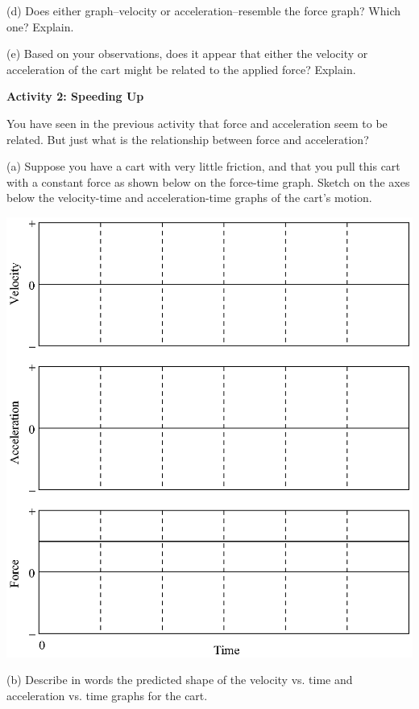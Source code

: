 (d) Does either graph--velocity or acceleration--resemble the force graph? Which
one? Explain.
\answerspace{20mm}

(e) Based on your observations, does it appear that either the velocity or acceleration
of the cart might be related to the applied force? Explain.
\answerspace{20mm}

\pagebreak[3]
\textbf{Activity 2: Speeding Up }

You have seen in the previous activity that force and acceleration seem to be
related. But just what is the relationship between force and acceleration? 

(a) Suppose you have a cart with very little friction, and that you pull this
cart with a constant force as shown below on the force-time graph. Sketch on
the axes below the velocity-time and acceleration-time graphs of the cart's
motion.

\vspace{0.3cm}
{\par\centering \includegraphics{force1/force1_fig3.eps} \par}
\vspace{0.3cm}

(b) Describe in words the predicted shape of the velocity vs. time and acceleration
vs. time graphs for the cart.
\vspace{20mm}

